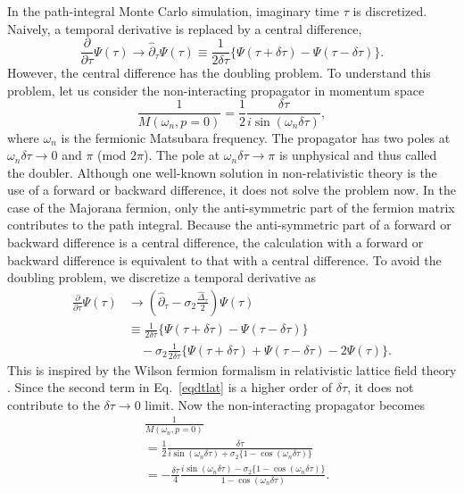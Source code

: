 \documentclass[aps,prb,superscriptaddress,twocolumn]{revtex4-1}
\begin{document}
In the path-integral Monte Carlo simulation, imaginary time $\tau$ is discretized.
Naively, a temporal derivative is replaced by a central difference,
\begin{equation}
 \frac{\partial}{\partial\tau} \Psi(\tau) 
\to \hat{\partial}_\tau \Psi(\tau)
\equiv \frac{1}{2\delta\tau} \{ \Psi(\tau+\delta\tau) - \Psi(\tau-\delta\tau) \}
.
\end{equation}
However, the central difference has the doubling problem.
To understand this problem, let us consider the non-interacting propagator in momentum space
\begin{equation}
\frac{1}{M(\omega_n,p=0)} 
= \frac{1}{2} \frac{\delta\tau}{i\sin (\omega_n\delta\tau)}
,
\end{equation}
where $\omega_n$ is the fermionic Matsubara frequency.
The propagator has two poles at $\omega_n\delta \tau \to 0$ and $\pi$ (mod $2\pi$).
The pole at $\omega_n\delta \tau \to \pi$ is unphysical and thus called the doubler.
Although one well-known solution in non-relativistic theory is the use of a forward or backward difference, it does not solve the problem now.
In the case of the Majorana fermion, only the anti-symmetric part of the fermion matrix contributes to the path integral.
Because the anti-symmetric part of a forward or backward difference is a central difference, the calculation with a forward or backward difference is equivalent to that with a central difference.
To avoid the doubling problem, we discretize a temporal derivative as
\begin{equation}
\begin{split}
 \frac{\partial}{\partial\tau} \Psi(\tau) 
&\to \left(\hat{\partial}_\tau - \sigma_2 \frac{\hat{\Delta}_\tau}{2}\right) \Psi(\tau)
\\
&\equiv \frac{1}{2\delta\tau} \{ \Psi(\tau+\delta\tau) - \Psi(\tau-\delta\tau) \}
\\
&\quad - \sigma_2 \frac{1}{2\delta\tau} \{ \Psi(\tau+\delta\tau) + \Psi(\tau-\delta\tau) - 2 \Psi(\tau) \}
.
\label{eqdtlat}
\end{split}
\end{equation}
This is inspired by the Wilson fermion formalism in relativistic lattice field theory \cite{wilson1977quarks}.
Since the second term in Eq.~\eqref{eqdtlat} is a higher order of $\delta \tau$, it does not contribute to the $\delta \tau \to 0$ limit.
Now the non-interacting propagator becomes
\begin{equation}
\begin{split}
&\frac{1}{M(\omega_n,p=0)} 
\\
&= \frac{1}{2} \frac{\delta\tau}{i\sin (\omega_n\delta\tau) + \sigma_2 \{1-\cos (\omega_n\delta\tau)\}}
\\
&= - \frac{\delta\tau}{4} \frac{i\sin (\omega_n\delta\tau) - \sigma_2 \{1-\cos (\omega_n\delta\tau)\}}{1-\cos (\omega_n\delta\tau)}
.
\end{split}
\end{equation}
\end{document}
